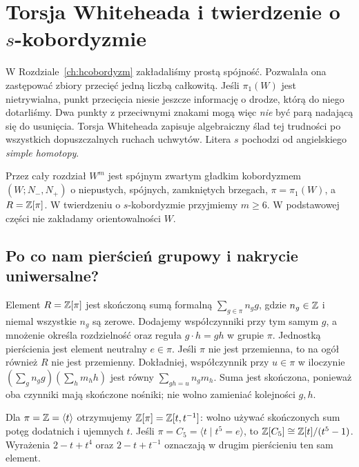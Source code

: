 \chapter{Torsja Whiteheada i twierdzenie o \texorpdfstring{$s$}{s}-kobordyzmie}
\label{ch:s-kobordyzm}

W Rozdziale~\ref{ch:hcobordyzm} zakładaliśmy prostą spójność.
Pozwalała ona zastępować zbiory przecięć jedną liczbą całkowitą.
Jeśli $\pi_1(W)$ jest nietrywialna, punkt przecięcia niesie jeszcze
informację o drodze, którą do niego dotarliśmy. Dwa punkty
z przeciwnymi znakami mogą więc \emph{nie} być parą nadającą się
do usunięcia. Torsja Whiteheada zapisuje algebraiczny ślad
tej trudności po wszystkich dopuszczalnych ruchach uchwytów.
Litera $s$ pochodzi od angielskiego \emph{simple homotopy}.

Przez cały rozdział $W^m$ jest spójnym zwartym gładkim kobordyzmem
$(W;N_-,N_+)$ o niepustych, spójnych, zamkniętych brzegach,
$\pi=\pi_1(W)$, a $R=\mathbb{Z}[\pi]$. W twierdzeniu o
$s$-kobordyzmie przyjmiemy $m\geq6$. W podstawowej części
nie zakładamy orientowalności $W$.

\section{Po co nam pierścień grupowy i nakrycie uniwersalne?}
\label{sec:pi-lancuchy-20}

\begin{definicja}
\label{def:pierscien-grupowy-20}
Element $R=\mathbb{Z}[\pi]$ jest skończoną sumą formalną
$\sum_{g\in\pi} n_g g$, gdzie $n_g\in\mathbb{Z}$ i niemal wszystkie
$n_g$ są zerowe. Dodajemy współczynniki przy tym samym $g$,
a mnożenie określa rozdzielność oraz reguła
$g\cdot h=gh$ w grupie $\pi$. Jednostką pierścienia jest
element neutralny $e\in\pi$. Jeśli $\pi$ nie jest przemienna,
to na ogół również $R$ nie jest przemienny.
Dokładniej, współczynnik przy $u\in\pi$ w iloczynie
$(\sum_g n_g g)(\sum_h m_h h)$ jest równy
$\sum_{gh=u}n_gm_h$. Suma jest skończona, ponieważ oba
czynniki mają skończone nośniki; nie wolno zamieniać kolejności $g,h$.
\end{definicja}

\begin{przyklad}
Dla $\pi=\mathbb{Z}=\langle t\rangle$ otrzymujemy
$\mathbb{Z}[\pi]=\mathbb{Z}[t,t^{-1}]$: wolno używać skończonych sum
potęg dodatnich i ujemnych $t$. Jeśli $\pi=C_5=\langle
t\mid t^5=e\rangle$, to
$\mathbb{Z}[C_5]\cong\mathbb{Z}[t]/(t^5-1)$. Wyrażenia $2-t+t^4$ oraz
$2-t+t^{-1}$ oznaczają w drugim pierścieniu ten sam element.
\end{przyklad}

